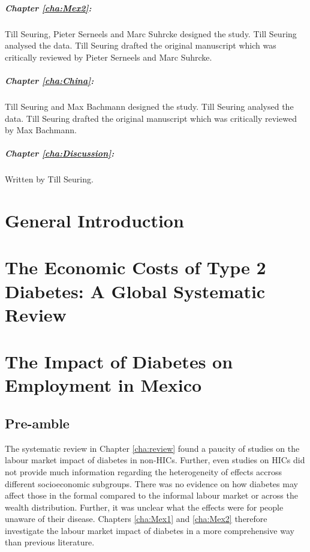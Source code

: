 \paragraph{Chapter \ref{cha:Mex2}:} Till Seuring, Pieter Serneels and Marc Suhrcke designed the study. Till Seuring analysed the data. Till Seuring drafted the original manuscript which was critically reviewed by Pieter Serneels and Marc Suhrcke.

\paragraph{Chapter \ref{cha:China}:} Till Seuring and Max Bachmann designed the study. Till Seuring analysed the data. Till Seuring drafted the original manuscript which was critically reviewed by Max Bachmann.

\paragraph{Chapter \ref{cha:Discussion}:} Written by Till Seuring.



\chapter{\label{cha:intro}General Introduction}

	
\chapter{\label{cha:review}The Economic Costs of Type 2 Diabetes: A Global Systematic Review}

\chapter{\label{cha:Mex1}The Impact of Diabetes on Employment in Mexico}
\section*{Pre-amble}

The systematic review in Chapter \ref{cha:review} found a paucity of studies on the labour market impact of diabetes in non-\acp{HIC}. Further, even studies on \acp{HIC} did not provide much information regarding the heterogeneity of effects accross different socioeconomic subgroups. There was no evidence on how diabetes may affect those in the formal compared to the informal labour market or across the wealth distribution. Further, it was unclear what the effects were for people unaware of their disease. Chapters \ref{cha:Mex1} and \ref{cha:Mex2} therefore investigate the labour market impact of diabetes in a more comprehensive way than previous literature.

